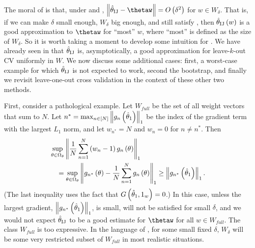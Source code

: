 
The moral of  is that, under \paperallcoreassum and
,
$\norm{\thetaij-{\thetaw}}=O\left(\delta^{2}\right)$ for $w\in W_{\delta}$. That
is, if we can make $\delta$ small enough, $W_{\delta}$ big enough, and still
satisfy , then $\hat{\theta}_{\textrm{IJ}}\left(w\right)$ is a good
approximation to $\thetaw$ for ``most'' $w$, where ``most'' is defined as the size
of $W_\delta$. So it is worth taking a moment to develop some intuition for
. We have already seen in
 that $\hat{\theta}_{\textrm{IJ}}$ is, asymptotically, a good
approximation for leave-$k$-out CV uniformly in $W$. We now discuss some additional
cases: first, a worst-case example for which $\hat{\theta}_{\textrm{IJ}}$ is not expected to work,
second the bootstrap, and finally we revisit leave-one-out cross
validation in the context of these other two methods.

First, consider a pathological example. Let $W_{full}$ be the set of all weight
vectors that sum to $N$. Let
$n^{*}=\max_{n\in[N]}\left\Vert g_{n}\left(\hat{\theta}_{1}\right)\right\Vert_{1}$ be the index of the
gradient term with the largest $L_{1}$ norm, and let $w_{n^{*}}=N$ and $w_n=0$
for $n \ne n^{*}$. Then
%
\begin{align*}
&\sup_{\theta\in\Omega_{\theta}}
    \left\Vert \frac{1}{N}\sum_{n=1}^{N}
        \left(w_{n}-1\right)g_{n}\left(\theta\right)\right\Vert_{1} \\
&\quad =\sup_{\theta\in\Omega_{\theta}}
    \left\Vert g_{n^{*}}\left(\theta\right)-
        \frac{1}{N}\sum_{n=1}^{N}g_{n}\left(\theta\right)\right\Vert_{1}
    \ge\left\Vert g_{n^{*}}\left(\hat{\theta}_{1}\right)\right\Vert_{1}.
\end{align*}
%
(The last inequality uses the fact that $G\left(\hat{\theta}_{1},1_{w}\right)=0$.) In
this case, unless the largest gradient,
$\left\Vert g_{n^{*}}\left(\hat{\theta}_{1}\right)\right\Vert_{1}$, is small,
 will not be satisfied for small $\delta$, and we
would not expect $\hat{\theta}_{\textrm{IJ}}$ to be a good estimate for $\thetaw$ for all $w\in
W_{full}$. The class $W_{full}$ is too expressive. In the language of
, for some small fixed $\delta$, $W_{\delta}$ will
be some very restricted subset of $W_{full}$ in most realistic situations.

